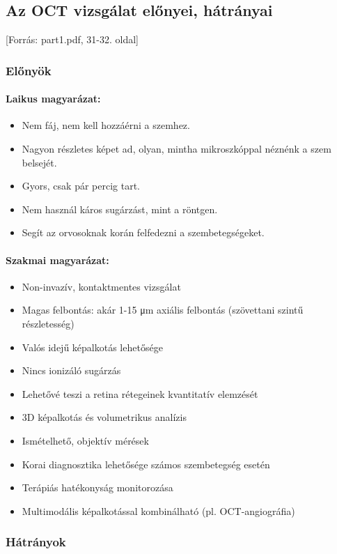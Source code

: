 \documentclass[a4paper,12pt]{article}
\begin{document}
\subsection{Az OCT vizsgálat előnyei, hátrányai} [Forrás: part1.pdf, 31-32. oldal]

\subsubsection{Előnyök}

\paragraph{Laikus magyarázat:} \begin{itemize} \item Nem fáj, nem kell hozzáérni a szemhez. \item Nagyon részletes képet ad, olyan, mintha mikroszkóppal néznénk a szem belsejét. \item Gyors, csak pár percig tart. \item Nem használ káros sugárzást, mint a röntgen. \item Segít az orvosoknak korán felfedezni a szembetegségeket. \end{itemize}

\paragraph{Szakmai magyarázat:} \begin{itemize} \item Non-invazív, kontaktmentes vizsgálat \item Magas felbontás: akár 1-15 μm axiális felbontás (szövettani szintű részletesség) \item Valós idejű képalkotás lehetősége \item Nincs ionizáló sugárzás \item Lehetővé teszi a retina rétegeinek kvantitatív elemzését \item 3D képalkotás és volumetrikus analízis \item Ismételhető, objektív mérések \item Korai diagnosztika lehetősége számos szembetegség esetén \item Terápiás hatékonyság monitorozása \item Multimodális képalkotással kombinálható (pl. OCT-angiográfia) \end{itemize}

\subsubsection{Hátrányok}
\end{document}
